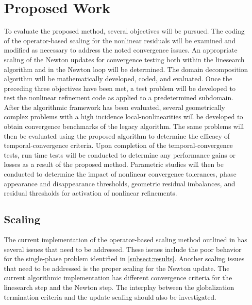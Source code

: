 \chapter{Proposed Work}
\label{chap:proposal}
To evaluate the proposed method, several objectives will be pursued.
The coding of the operator-based scaling for the nonlinear residuals will be examined and modified as necessary to address the noted convergence issues.
An appropriate scaling of the Newton updates for convergence testing both within the linesearch algorithm and in the Newton loop will be determined.
The domain decomposition algorithm will be mathematically developed, coded, and evaluated.
Once the preceding three objectives have been met, a test problem will be developed to test the nonlinear refinement code as applied to a predetermined subdomain.
After the algorithmic framework has been evaluated, several geometrically complex problems with a high incidence local-nonlinearities will be developed to obtain convergence benchmarks of the legacy algorithm.
The same problems will then be evaluated using the proposed algorithm to determine the efficacy of temporal-convergence criteria.
Upon completion of the temporal-convergence tests, run time tests will be conducted to determine any performance gains or losses as a result of the proposed method.
Parametric studies will then be conducted to determine the impact of nonlinear convergence tolerances, phase appearance and disappearance thresholds, geometric residual imbalances, and residual thresholds for activation of nonlinear refinements.

\section{Scaling}
\label{sect:proposal_scaling}
The current implementation of the operator-based scaling method outlined in  has several issues that need to be addressed.
These issues include the poor behavior for the single-phase problem identified in \ref{subsect:results}.
Another scaling issues that need to be addressed is the proper scaling for the Newton update.
The current algorithmic implementation has different convergence criteria for the linesearch step and the Newton step.
The interplay between the globalization termination criteria and the update scaling should also be investigated. 

